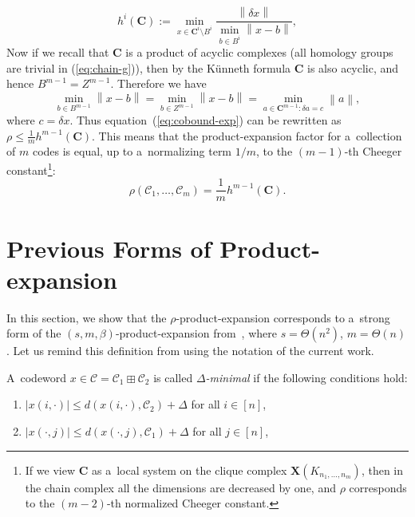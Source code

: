 \documentclass[11pt]{article}
\let\le\leqslant
\theoremstyle{plain}
\theoremstyle{definition}
\theoremstyle{remark}
\newcommand{\norm}[1]{\left\lVert#1\right\rVert}
\newcommand{\cC}{\mathcal{C}}
\newcommand{\sC}{{\mathbf{C}}}
\begin{document}
\begin{equation*}
h^i(\sC) :=  \min_{x\in\sC^{i}\setminus B^{i}} \frac{\norm{\delta x}}{\min_{b\in B^{i}} \norm{x - b}},  
\end{equation*}
Now if we recall that $\sC$ is a product of acyclic complexes (all homology groups are trivial in (\ref{eq:chain-g})), then by the K\"{u}nneth formula $\sC$ is also acyclic, and hence $B^{m-1} = Z^{m-1}$. Therefore we have  
\begin{equation}
\min_{b\in B^{m-1}} \norm{x - b} = \min_{b\in Z^{m-1}} \norm{x - b} = \min_{a\in \sC^{m-1}\colon \delta a = c} \norm{a},  
\end{equation}
where $c = \delta x$. Thus equation~(\ref{eq:cobound-exp}) can be rewritten as $\rho \le \frac1m h^{m-1}(\sC)$. This means that the product-expansion factor for a~collection of $m$ codes is equal, up to a~normalizing term $1/m$, to the $(m-1)$-th Cheeger constant\footnote{If we view $\sC$ as a~local system on the clique complex $\mathbf{X}(K_{n_1,\dots,n_m})$, then in the chain complex all the dimensions are decreased by one, and $\rho$ corresponds to the $(m-2)$-th normalized Cheeger constant.}:
\begin{equation}
  \rho(\cC_1,\dots,\cC_m) = \frac1m h^{m-1}(\sC).     
\end{equation}





\section{Previous Forms of Product-expansion}\label{app:prod-exp}

In this section, we show that the $\rho$-product-expansion corresponds to a~strong form of the $(s,m,\beta)$-product-expansion from~\cite{Panteleev&Kalachev:stoc2022}, where $s=\Theta(n^2)$, $m=\Theta(n)$. Let us remind this definition from \cite{Panteleev&Kalachev:stoc2022} using the notation of the current work.

A~codeword $x\in \cC=\cC_1\boxplus \cC_2$ is called \emph{$\Delta$-minimal} if the following conditions hold:
\begin{enumerate}
    \item $|x(i,\cdot)|\le d(x(i,\cdot), \cC_2)+\Delta$ for all $i\in [n]$,
    \item $|x(\cdot,j)|\le d(x(\cdot,j), \cC_1)+\Delta$ for all $j\in [n]$,
\end{enumerate}
\end{document}
